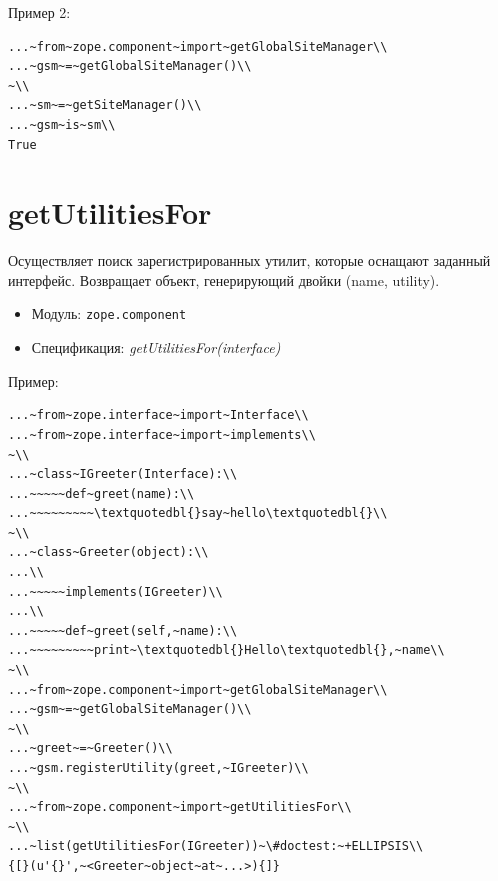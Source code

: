 \documentclass[a4paper,openany,twoside,draft]{book}
\providecommand*{\DUroletitlereference}[1]{\textsl{#1}}
\begin{document}
Пример 2:

\begin{verbatim}
...~from~zope.component~import~getGlobalSiteManager\\
...~gsm~=~getGlobalSiteManager()\\
~\\
...~sm~=~getSiteManager()\\
...~gsm~is~sm\\
True
\end{verbatim}


\section*{getUtilitiesFor%
  \label{getutilitiesfor}%
}

Осуществляет поиск зарегистрированных утилит, которые оснащают
заданный интерфейс.  Возвращает объект, генерирующий двойки (name, utility).

\begin{itemize}

\item Модуль: \texttt{zope.component}

\item Спецификация: \DUroletitlereference{getUtilitiesFor(interface)}

\end{itemize}

Пример:

\begin{verbatim}
...~from~zope.interface~import~Interface\\
...~from~zope.interface~import~implements\\
~\\
...~class~IGreeter(Interface):\\
...~~~~~def~greet(name):\\
...~~~~~~~~~\textquotedbl{}say~hello\textquotedbl{}\\
~\\
...~class~Greeter(object):\\
...\\
...~~~~~implements(IGreeter)\\
...\\
...~~~~~def~greet(self,~name):\\
...~~~~~~~~~print~\textquotedbl{}Hello\textquotedbl{},~name\\
~\\
...~from~zope.component~import~getGlobalSiteManager\\
...~gsm~=~getGlobalSiteManager()\\
~\\
...~greet~=~Greeter()\\
...~gsm.registerUtility(greet,~IGreeter)\\
~\\
...~from~zope.component~import~getUtilitiesFor\\
~\\
...~list(getUtilitiesFor(IGreeter))~\#doctest:~+ELLIPSIS\\
{[}(u'{}',~<Greeter~object~at~...>){]}
\end{verbatim}
\end{document}
